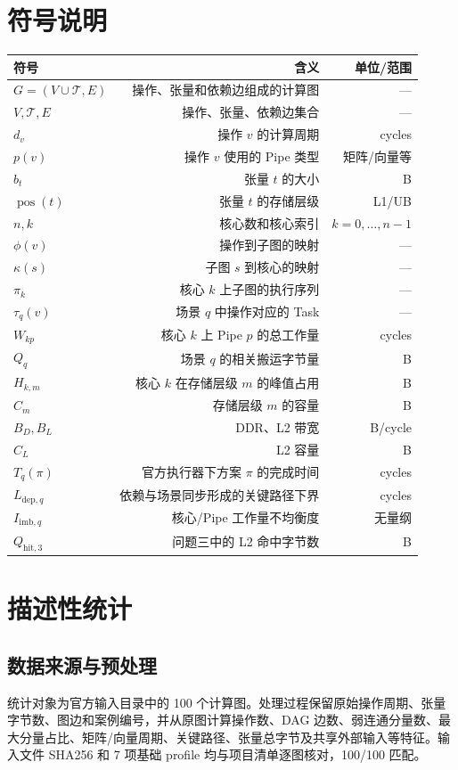 \documentclass[UTF8,a4paper,zihao=-4]{ctexart}
\numberwithin{equation}{section}
\numberwithin{figure}{section}
\numberwithin{table}{section}
\begin{document}
\section{符号说明}
\begin{table}[htbp]
\centering\small
\begin{tabular}{lrr}
\toprule
符号 & 含义 & 单位/范围 \\
\midrule
$G=(V\cup\mathcal T,E)$ & 操作、张量和依赖边组成的计算图 & — \\
$V,\mathcal T,E$ & 操作、张量、依赖边集合 & — \\
$d_v$ & 操作 $v$ 的计算周期 & cycles \\
$p(v)$ & 操作 $v$ 使用的 Pipe 类型 & 矩阵/向量等 \\
$b_t$ & 张量 $t$ 的大小 & B \\
$\operatorname{pos}(t)$ & 张量 $t$ 的存储层级 & L1/UB \\
$n,k$ & 核心数和核心索引 & $k=0,\ldots,n-1$ \\
$\phi(v)$ & 操作到子图的映射 & — \\
$\kappa(s)$ & 子图 $s$ 到核心的映射 & — \\
$\pi_k$ & 核心 $k$ 上子图的执行序列 & — \\
$\tau_q(v)$ & 场景 $q$ 中操作对应的 Task & — \\
$W_{kp}$ & 核心 $k$ 上 Pipe $p$ 的总工作量 & cycles \\
$Q_q$ & 场景 $q$ 的相关搬运字节量 & B \\
$H_{k,m}$ & 核心 $k$ 在存储层级 $m$ 的峰值占用 & B \\
$C_m$ & 存储层级 $m$ 的容量 & B \\
$B_D,B_L$ & DDR、L2 带宽 & B/cycle \\
$C_L$ & L2 容量 & B \\
$T_q(\pi)$ & 官方执行器下方案 $\pi$ 的完成时间 & cycles \\
$L_{\mathrm{dep},q}$ & 依赖与场景同步形成的关键路径下界 & cycles \\
$I_{\mathrm{imb},q}$ & 核心/Pipe 工作量不均衡度 & 无量纲 \\
$Q_{\mathrm{hit},3}$ & 问题三中的 L2 命中字节数 & B \\
\bottomrule
\end{tabular}
\end{table}
\section{描述性统计}
\subsection{数据来源与预处理}
统计对象为官方输入目录中的 100 个计算图。处理过程保留原始操作周期、张量字节数、图边和案例编号，并从原图计算操作数、DAG 边数、弱连通分量数、最大分量占比、矩阵/向量周期、关键路径、张量总字节及共享外部输入等特征。输入文件 SHA256 和 7 项基础 profile 均与项目清单逐图核对，100/100 匹配。
\end{document}
